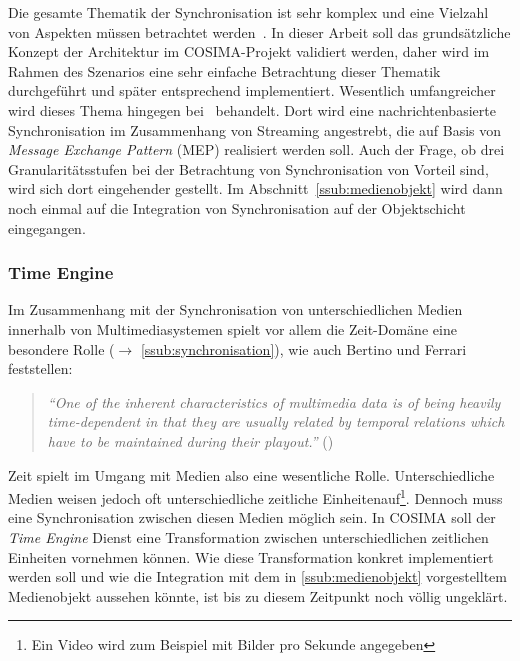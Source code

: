   Die gesamte Thematik der Synchronisation ist sehr komplex und eine Vielzahl von Aspekten müssen betrachtet werden~\citep[S. 27ff]{bericht}. In dieser Arbeit soll das grundsätzliche Konzept der Architektur im COSIMA-Projekt validiert werden, daher wird im Rahmen des Szenarios eine sehr einfache Betrachtung dieser Thematik durchgeführt und später entsprechend implementiert. Wesentlich umfangreicher wird dieses Thema hingegen bei~\citep{antons09} behandelt. Dort wird eine nachrichtenbasierte Synchronisation im Zusammenhang von Streaming angestrebt, die auf Basis von \emph{Message Exchange Pattern} (MEP) realisiert werden soll. Auch der Frage, ob drei Granularitätsstufen bei der Betrachtung von Synchronisation von Vorteil sind, wird sich dort eingehender gestellt. Im Abschnitt~\ref{ssub:medienobjekt} wird dann noch einmal auf die Integration von Synchronisation auf der Objektschicht eingegangen.



\subsubsection{Time Engine} %
\label{ssub:time_engine}

  Im Zusammenhang mit der Synchronisation von unterschiedlichen Medien innerhalb von Multimediasystemen spielt vor allem die Zeit-Domäne eine besondere Rolle ($\to$ \ref{ssub:synchronisation}), wie auch Bertino und Ferrari feststellen:

  \begin{quote}
    \emph{"`One of the inherent characteristics of multimedia data is of being heavily time-dependent in that they are usually related by temporal relations which have to be maintained during their playout."'} (\citep[S. 612]{bertino1998tsm})
  \end{quote}
  
  Zeit spielt im Umgang mit Medien also eine wesentliche Rolle. Unterschiedliche Medien weisen jedoch oft unterschiedliche zeitliche Einheitenauf\footnote{Ein Video wird zum Beispiel mit Bilder pro Sekunde angegeben}. Dennoch muss eine Synchronisation zwischen diesen Medien möglich sein. In COSIMA soll der \emph{Time Engine} Dienst eine Transformation zwischen unterschiedlichen zeitlichen Einheiten vornehmen können. Wie diese Transformation konkret implementiert werden soll und wie die Integration mit dem in \ref{ssub:medienobjekt} vorgestelltem Medienobjekt aussehen könnte, ist bis zu diesem Zeitpunkt noch völlig ungeklärt.
  
